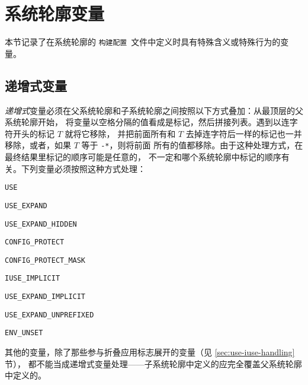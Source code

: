 \section{系统轮廓变量}
\label{sec:profile-variables}

本节记录了在系统轮廓的 \texttt{构建配置}\ 文件中定义时具有特殊含义或特殊行为的变量。

\subsection{递增式变量}
\textit{递增式}变量必须在父系统轮廓和子系统轮廓之间按照以下方式叠加：从最顶层的父系统轮廓开始，
将变量以空格分隔的值看成是标记，然后拼接列表。遇到以连字符开头的标记 $T$ 就将它移除，
并把前面所有和 $T$ 去掉连字符后一样的标记也一并移除，或者，如果 $T$ 等于 \texttt{-*}，则将前面
所有的值都移除。由于这种处理方式，在最终结果里标记的顺序可能是任意的，
不一定和哪个系统轮廓中标记的顺序有关。下列变量必须按照这种方式处理：
\begin{compactitem}
\item \texttt{USE}
\item \texttt{USE_EXPAND}
\item \texttt{USE_EXPAND_HIDDEN}
\item \texttt{CONFIG_PROTECT}
\item \texttt{CONFIG_PROTECT_MASK}
\item \texttt{IUSE_IMPLICIT}
\item \texttt{USE_EXPAND_IMPLICIT}
\item \texttt{USE_EXPAND_UNPREFIXED}
\item \texttt{ENV_UNSET}
\end{compactitem}

其他的变量，除了那些参与折叠应用标志展开的变量（见 \ref{sec:use-iuse-handling} 节），
都不能当成递增式变量处理——子系统轮廓中定义的应完全覆盖父系统轮廓中定义的。


